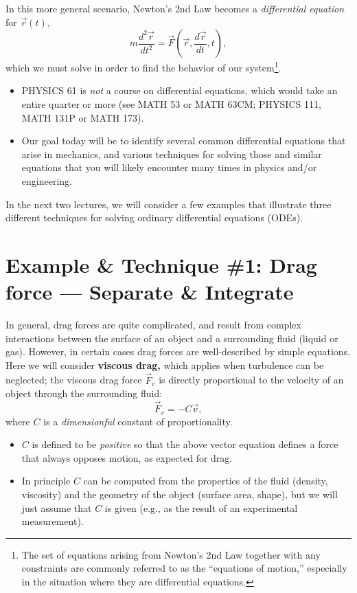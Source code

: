 \documentclass[11pt, letterpaper, openany]{book}
\begin{document}
In this more general scenario, Newton's 2nd Law becomes a \textit{differential equation} for $\vec{r}(t)$,
\[ m\frac{d^2\vec{r}}{dt^2} = \vec{F}\left(\vec{r}, \frac{d\vec{r}}{dt}, t\right), \tag{3} \]
which we must solve in order to find the behavior of our system\footnote{The set of equations arising from Newton's 2nd Law together with any constraints are commonly referred to as the ``equations of motion,'' especially in the situation where they are differential equations.}.

\begin{itemize}
    \item PHYSICS 61 is \textit{not} a course on differential equations, which would take an entire quarter or more (see MATH 53 or MATH 63CM; PHYSICS 111, MATH 131P or MATH 173).
    \item Our goal today will be to identify several common differential equations that arise in mechanics, and various techniques for solving those and similar equations that you will likely encounter many times in physics and/or engineering.
\end{itemize}

In the next two lectures, we will consider a few examples that illustrate three different techniques for solving ordinary differential equations (ODEs).

\section*{Example \& Technique \#1: Drag force --- Separate \& Integrate}

In general, drag forces are quite complicated, and result from complex interactions between the surface of an object and a surrounding fluid (liquid or gas). However, in certain cases drag forces are well-described by simple equations. Here we will consider \textbf{viscous drag,} which applies when turbulence can be neglected; the viscous drag force $\vec{F}_v$ is directly proportional to the velocity of an object through the surrounding fluid:
\[ \vec{F}_v = -C\vec{v}, \tag{4} \]
where $C$ is a \textit{dimensionful} constant of proportionality.
\begin{itemize}
    \item $C$ is defined to be \textit{positive} so that the above vector equation defines a force that always opposes motion, as expected for drag.
    \item In principle $C$ can be computed from the properties of the fluid (density, viscosity) and the geometry of the object (surface area, shape), but we will just assume that $C$ is given (e.g., as the result of an experimental measurement).
\end{itemize}
\end{document}
